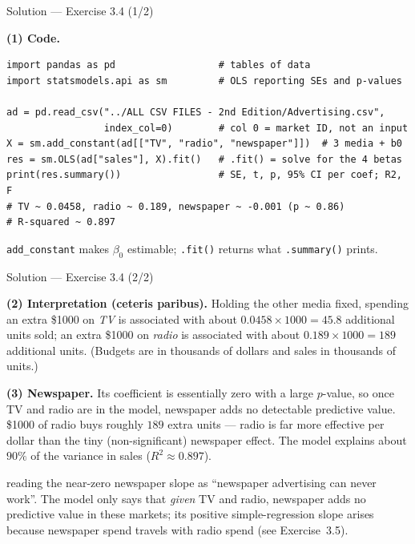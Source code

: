 \documentclass[aspectratio=169,11pt]{beamer}
\begin{document}
\begin{frame}[fragile]{Solution --- Exercise 3.4 (1/2)}
  \begin{solutionbox}
    \textbf{(1) Code.}
\begin{lstlisting}
import pandas as pd                  # tables of data
import statsmodels.api as sm         # OLS reporting SEs and p-values

ad = pd.read_csv("../ALL CSV FILES - 2nd Edition/Advertising.csv",
                 index_col=0)        # col 0 = market ID, not an input
X = sm.add_constant(ad[["TV", "radio", "newspaper"]])  # 3 media + b0
res = sm.OLS(ad["sales"], X).fit()   # .fit() = solve for the 4 betas
print(res.summary())                 # SE, t, p, 95% CI per coef; R2, F
# TV ~ 0.0458, radio ~ 0.189, newspaper ~ -0.001 (p ~ 0.86)
# R-squared ~ 0.897
\end{lstlisting}
  \end{solutionbox}
  \begin{readme}\footnotesize
    \texttt{add\_constant} makes $\beta_0$ estimable; \texttt{.fit()}
    returns what \texttt{.summary()} prints.
  \end{readme}
\end{frame}

\begin{frame}{Solution --- Exercise 3.4 (2/2)}
  \begin{solutionbox}
    \textbf{(2) Interpretation (ceteris paribus).}
    Holding the other media fixed, spending an extra \$1000 on
    \emph{TV} is associated with about
    $0.0458\times 1000 = 45.8$ additional units sold; an extra \$1000 on
    \emph{radio} is associated with about
    $0.189\times 1000 = 189$ additional units. (Budgets are in
    thousands of dollars and sales in thousands of units.)

    \textbf{(3) Newspaper.} Its coefficient is essentially zero with a
    large $p$-value, so once TV and radio are in the model, newspaper
    adds no detectable predictive value. \$1000 of radio buys roughly
    $189$ extra units --- radio is far more effective per dollar than
    the tiny (non-significant) newspaper effect. The model explains
    about $90\%$ of the variance in sales ($R^2\approx 0.897$).
  \end{solutionbox}
  \begin{mistake}
    reading the near-zero newspaper slope as
    ``newspaper advertising can never work''. The model only says that
    \emph{given} TV and radio, newspaper adds no predictive value in
    these markets; its positive simple-regression slope arises because
    newspaper spend travels with radio spend (see Exercise~3.5).
  \end{mistake}
\end{frame}
\end{document}

